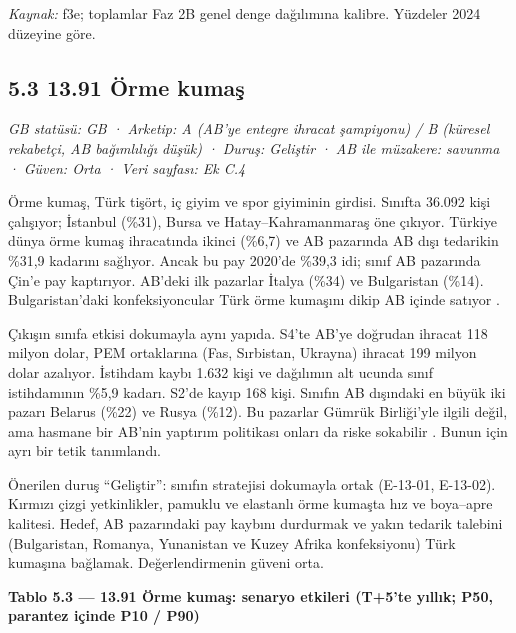 \endgroup

\emph{Kaynak:} \etiketT{} f3e; toplamlar Faz 2B genel denge dağılımına kalibre. Yüzdeler 2024 düzeyine göre.

\hypertarget{nace_kartlar_13-15-53-1391-uxf6rme-kumaux15f}{%
\subsection{5.3 13.91 Örme kumaş}\label{nace_kartlar_13-15-53-1391-uxf6rme-kumaux15f}}

\emph{GB statüsü: GB · Arketip: A (AB'ye entegre ihracat şampiyonu) / B (küresel rekabetçi, AB bağımlılığı düşük) · Duruş: Geliştir · AB ile müzakere: savunma · Güven: Orta · Veri sayfası: Ek C.4}

Örme kumaş, Türk tişört, iç giyim ve spor giyiminin girdisi. Sınıfta 36.092 kişi çalışıyor; İstanbul (\%31), Bursa ve Hatay--Kahramanmaraş öne çıkıyor. Türkiye dünya örme kumaş ihracatında ikinci (\%6,7) ve AB pazarında AB dışı tedarikin \%31,9 kadarını sağlıyor. Ancak bu pay 2020'de \%39,3 idi; sınıf AB pazarında Çin'e pay kaptırıyor. AB'deki ilk pazarlar İtalya (\%34) ve Bulgaristan (\%14). Bulgaristan'daki konfeksiyoncular Türk örme kumaşını dikip AB içinde satıyor \etiketH{}.

Çıkışın sınıfa etkisi dokumayla aynı yapıda. S4'te AB'ye doğrudan ihracat 118 milyon dolar, PEM ortaklarına (Fas, Sırbistan, Ukrayna) ihracat 199 milyon dolar azalıyor. İstihdam kaybı 1.632 kişi ve dağılımın alt ucunda sınıf istihdamının \%5,9 kadarı. S2'de kayıp 168 kişi. Sınıfın AB dışındaki en büyük iki pazarı Belarus (\%22) ve Rusya (\%12). Bu pazarlar Gümrük Birliği'yle ilgili değil, ama hasmane bir AB'nin yaptırım politikası onları da riske sokabilir \etiketH{}. Bunun için ayrı bir tetik tanımlandı.

Önerilen duruş ``Geliştir'': sınıfın stratejisi dokumayla ortak (E-13-01, E-13-02). Kırmızı çizgi yetkinlikler, pamuklu ve elastanlı örme kumaşta hız ve boya--apre kalitesi. Hedef, AB pazarındaki pay kaybını durdurmak ve yakın tedarik talebini (Bulgaristan, Romanya, Yunanistan ve Kuzey Afrika konfeksiyonu) Türk kumaşına bağlamak. Değerlendirmenin güveni orta.


\textbf{Tablo 5.3 --- 13.91 Örme kumaş: senaryo etkileri (T+5'te yıllık; P50, parantez içinde P10 / P90)}

\nopagebreak[4]

\begingroup\gbtablo\small

